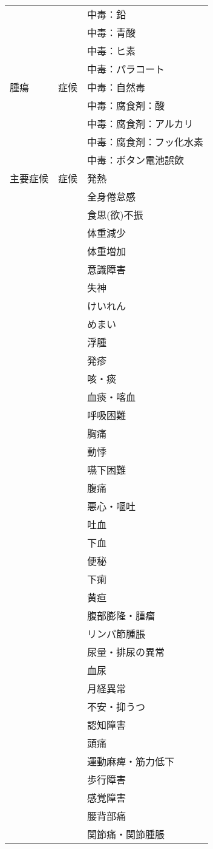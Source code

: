 \begin{xltabular}{\linewidth}{XXX}
 &  & 中毒：鉛 \\
 &  & 中毒：青酸 \\
 &  & 中毒：ヒ素 \\
 &  & 中毒：パラコート \\
腫瘍 & 症候 & 中毒：自然毒 \\
 &  & 中毒：腐食剤：酸 \\
 &  & 中毒：腐食剤：アルカリ \\
 &  & 中毒：腐食剤：フッ化水素 \\
 &  & 中毒：ボタン電池誤飲  \\
主要症候 & 症候 & 発熱 \\
 &  & 全身倦怠感 \\
 &  & 食思(欲)不振 \\
 &  & 体重減少 \\
 &  & 体重増加 \\
 &  & 意識障害 \\
 &  & 失神 \\
 &  & けいれん \\
 &  & めまい \\
 &  & 浮腫 \\
 &  & 発疹 \\
 &  & 咳・痰 \\
 &  & 血痰・喀血 \\
 &  & 呼吸困難 \\
 &  & 胸痛 \\
 &  & 動悸 \\
 &  & 嚥下困難 \\
 &  & 腹痛 \\
 &  & 悪心・嘔吐 \\
 &  & 吐血 \\
 &  & 下血 \\
 &  & 便秘 \\
 &  & 下痢 \\
 &  & 黄疸 \\
 &  & 腹部膨隆・腫瘤 \\
 &  & リンパ節腫脹 \\
 &  & 尿量・排尿の異常 \\
 &  & 血尿 \\
 &  & 月経異常 \\
 &  & 不安・抑うつ \\
 &  & 認知障害 \\
 &  & 頭痛 \\
 &  & 運動麻痺・筋力低下 \\
 &  & 歩行障害 \\
 &  & 感覚障害 \\
 &  & 腰背部痛 \\
 &  & 関節痛・関節腫脹 \\
\bottomrule
\end{xltabular}


